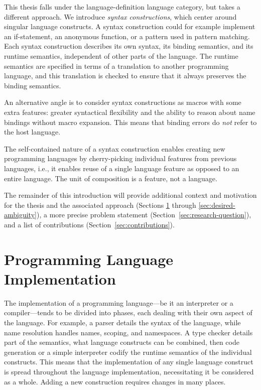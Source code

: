 \documentclass{kththesis}
\begin{document}

This thesis falls under the language-definition language category, but takes a different approach. We introduce \emph{syntax constructions}, which center around singular language constructs. A syntax construction could for example implement an if-statement, an anonymous function, or a pattern used in pattern matching. Each syntax construction describes its own syntax, its binding semantics, and its runtime semantics, independent of other parts of the language. The runtime semantics are specified in terms of a translation to another programming language, and this translation is checked to ensure that it always preserves the binding semantics.

An alternative angle is to consider syntax constructions as macros with some extra features: greater syntactical flexibility and the ability to reason about name bindings without macro expansion. This means that binding errors do \emph{not} refer to the host language.

The self-contained nature of a syntax construction enables creating new programming languages by cherry-picking individual features from previous languages, i.e., it enables reuse of a single language feature as opposed to an entire language. The unit of composition is a feature, not a language.

The remainder of this introduction will provide additional context and motivation for the thesis and the associated approach (Sections \ref{sec:compiler-design} through \ref{sec:desired-ambiguity}), a more precise problem statement (Section~\ref{sec:research-question}), and a list of contributions (Section~\ref{sec:contributions}).

\section{Programming Language Implementation} \label{sec:compiler-design}

The implementation of a programming language---be it an interpreter or a compiler---tends to be divided into phases, each dealing with their own aspect of the language. For example, a parser details the syntax of the language, while name resolution handles names, scoping, and namespaces. A type checker details part of the semantics, what language constructs can be combined, then code generation or a simple interpreter codify the runtime semantics of the individual constructs. This means that the implementation of any single language construct is spread throughout the language implementation, necessitating it be considered as a whole. Adding a new construction requires changes in many places.
\end{document}

